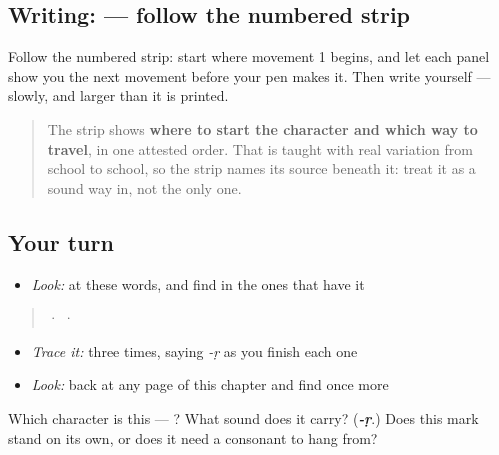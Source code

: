 \subsection*{Writing:  — follow the numbered strip}

Follow the numbered strip: start where movement 1 begins, and let each panel show you the next movement before your pen makes it. Then write  yourself — slowly, and larger than it is printed.

\begin{quote}
The strip shows \textbf{where to start the character and which way to travel}, in one attested order. That is taught with real variation from school to school, so the strip names its source beneath it: treat it as a sound way in, not the only one.
\end{quote}

\subsection*{Your turn}
\begin{itemize}
\raggedright
  \item \emph{Look:} at these words, and find  in the ones that have it
\end{itemize}

\begin{quote}
  ·    ·  
\end{quote}

\begin{itemize}
\raggedright
  \item \emph{Trace it:}  three times, saying \emph{-ṛ} as you finish each one
  \item \emph{Look:} back at any page of this chapter and find  once more
\end{itemize}

\begin{tcolorbox}[breakable,colback=teal!4,colframe=teal!35!black,title={Before you move on}]
Which character is this — ? What sound does it carry? (\emph{\textbf{-ṛ}}.) Does this mark stand on its own, or does it need a consonant to hang from?
\end{tcolorbox}
